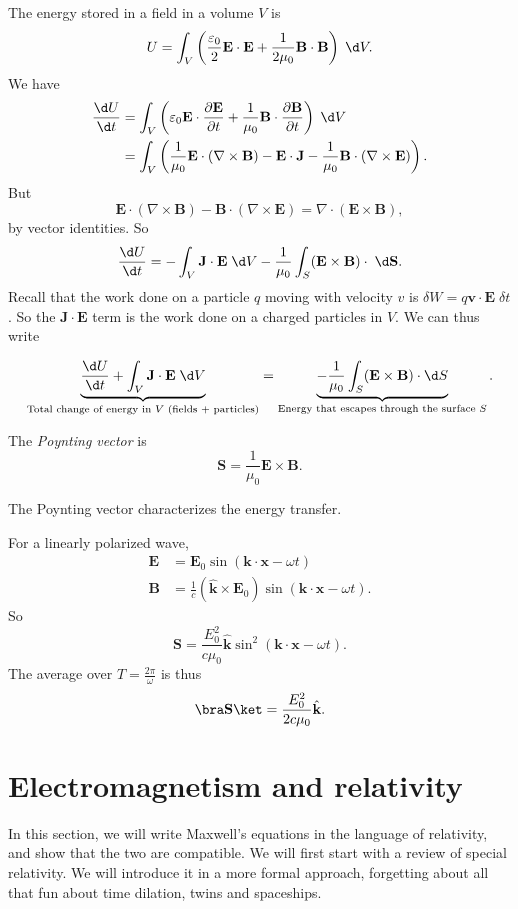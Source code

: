 \documentclass[a4paper]{article}
\begin{document}
The energy stored in a field in a volume $V$ is
\[
  U = \int_V \left(\frac{\varepsilon_0}{2}\mathbf{E}\cdot \mathbf{E} + \frac{1}{2\mu_0}\mathbf{B}\cdot \mathbf{B}\right)\;\d V.
\]
We have
\begin{align*}
  \frac{\d U}{\d t} &= \int_V \left(\varepsilon_0 \mathbf{E}\cdot \frac{\partial \mathbf{E}}{\partial t} + \frac{1}{\mu_0}\mathbf{B}\cdot \frac{\partial \mathbf{B}}{\partial t}\right)\;\d V\\
  &= \int_V \left(\frac{1}{\mu_0}\mathbf{E}\cdot (\nabla\times \mathbf{B}) - \mathbf{E}\cdot \mathbf{J} - \frac{1}{\mu_0}\mathbf{B}\cdot (\nabla\times \mathbf{E})\right).
\end{align*}
But
\[
  \mathbf{E}\cdot (\nabla \times \mathbf{B}) - \mathbf{B}\cdot (\nabla\times \mathbf{E}) = \nabla\cdot (\mathbf{E}\times \mathbf{B}),
\]
by vector identities. So
\[
  \frac{\d U}{\d t} = -\int_V \mathbf{J}\cdot \mathbf{E}\;\d V - \frac{1}{\mu_0}\int_S (\mathbf{E}\times \mathbf{B})\cdot \;\d \mathbf{S}.
\]
Recall that the work done on a particle $q$ moving with velocity $v$ is $\delta W = q\mathbf{v}\cdot \mathbf{E}\;\delta t$. So the $\mathbf{J}\cdot \mathbf{E}$ term is the work done on a charged particles in $V$. We can thus write
\begin{thm}
  \[
    \underbrace{\frac{\d U}{\d t} + \int_V \mathbf{J}\cdot \mathbf{E} \;\d V}_{\text{Total change of energy in $V$ (fields + particles)}} = \underbrace{-\frac{1}{\mu_0}\int_S (\mathbf{E}\times \mathbf{B})\cdot\d S}_{\text{Energy that escapes through the surface }S}.
  \]
\end{thm}

\begin{defi}
  The \emph{Poynting vector} is
  \[
    \mathbf{S} = \frac{1}{\mu_0}\mathbf{E}\times \mathbf{B}.
  \]
\end{defi}
The Poynting vector characterizes the energy transfer.

For a linearly polarized wave,
\begin{align*}
  \mathbf{E} &= \mathbf{E}_0 \sin (\mathbf{k}\cdot \mathbf{x} - \omega t)\\
  \mathbf{B} &= \frac{1}{c}(\hat{\mathbf{k}}\times \mathbf{E}_0)\sin (\mathbf{k}\cdot \mathbf{x} - \omega t).
\end{align*}
So
\[
  \mathbf{S} = \frac{E_0^2}{c\mu_0}\hat{\mathbf{k}} \sin^2(\mathbf{k}\cdot\mathbf{x} - \omega t).
\]
The average over $T = \frac{2\pi}{\omega}$ is thus
\[
  \bra\mathbf{S}\ket = \frac{E_0^2}{2c\mu_0}\hat{\mathbf{k}}.
\]
\section{Electromagnetism and relativity}
In this section, we will write Maxwell's equations in the language of relativity, and show that the two are compatible. We will first start with a review of special relativity. We will introduce it in a more formal approach, forgetting about all that fun about time dilation, twins and spaceships.
\end{document}
